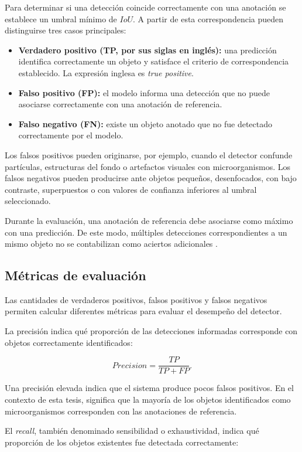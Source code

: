 Para determinar si una detección coincide correctamente con una anotación se establece un umbral mínimo de $IoU$. A partir de esta correspondencia pueden distinguirse tres casos principales:

\begin{itemize}
  \item \textbf{Verdadero positivo (TP, por sus siglas en inglés):} una predicción identifica correctamente un objeto y satisface el criterio de correspondencia establecido. La expresión inglesa es \textit{true positive}.
  \item \textbf{Falso positivo (FP):} el modelo informa una detección que no puede asociarse correctamente con una anotación de referencia.
  \item \textbf{Falso negativo (FN):} existe un objeto anotado que no fue detectado correctamente por el modelo.
\end{itemize}

Los falsos positivos pueden originarse, por ejemplo, cuando el detector confunde partículas, estructuras del fondo o artefactos visuales con microorganismos. Los falsos negativos pueden producirse ante objetos pequeños, desenfocados, con bajo contraste, superpuestos o con valores de confianza inferiores al umbral seleccionado.

Durante la evaluación, una anotación de referencia debe asociarse como máximo con una predicción. De este modo, múltiples detecciones correspondientes a un mismo objeto no se contabilizan como aciertos adicionales \cite{everingham2010}.

\subsection{Métricas de evaluación}

Las cantidades de verdaderos positivos, falsos positivos y falsos negativos permiten calcular diferentes métricas para evaluar el desempeño del detector.

La precisión indica qué proporción de las detecciones informadas corresponde con objetos correctamente identificados:

\[
Precision=\frac{TP}{TP+FP}.
\]

Una precisión elevada indica que el sistema produce pocos falsos positivos. En el contexto de esta tesis, significa que la mayoría de los objetos identificados como microorganismos corresponden con las anotaciones de referencia.

El \textit{recall}, también denominado sensibilidad o exhaustividad, indica qué proporción de los objetos existentes fue detectada correctamente:

